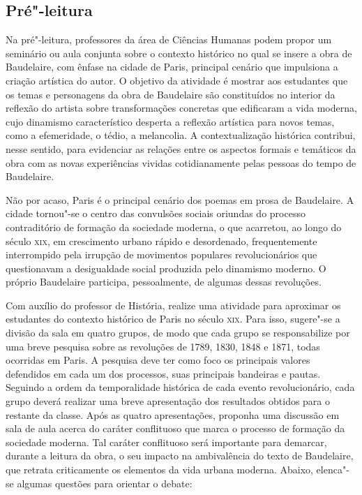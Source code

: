 \documentclass[12pt]{extarticle}
\begin{document}
\subsection{Pré"-leitura}

Na pré"-leitura, professores da área de Ciências Humanas
podem propor um seminário ou aula conjunta sobre o contexto histórico no qual se insere
a obra de Baudelaire, com ênfase na cidade de Paris, principal cenário que impulsiona a criação artística do autor. 
O objetivo da atividade é mostrar aos estudantes que os temas e personagens da obra de Baudelaire são constituídos no interior da reflexão do artista sobre transformações concretas que edificaram a vida moderna, cujo dinamismo característico desperta a reflexão artística para novos temas, como a efemeridade, o tédio, a melancolia. A contextualização histórica contribui, nesse sentido, para evidenciar as relações entre os aspectos formais e temáticos da obra com as novas experiências vividas cotidianamente pelas pessoas do tempo de Baudelaire.

Não por acaso, Paris é o principal cenário dos poemas em prosa de Baudelaire. A cidade tornou"-se o centro das convulsões sociais oriundas do processo contraditório de formação da sociedade moderna, o que acarretou, ao longo do século \textsc{xix}, em crescimento urbano rápido e desordenado, frequentemente interrompido pela irrupção de movimentos populares revolucionários que questionavam a desigualdade social produzida pelo dinamismo moderno. O próprio Baudelaire participa, pessoalmente, de algumas dessas revoluções.


Com auxílio do professor de História, realize uma atividade para aproximar os estudantes do contexto histórico de Paris no século \textsc{xix}. Para isso, sugere"-se a divisão da sala em quatro grupos, de modo que cada grupo se responsabilize por uma breve pesquisa sobre as revoluções de 1789, 1830, 1848 e 1871, todas ocorridas em Paris. A pesquisa deve ter como foco os principais valores defendidos em cada um dos processos, suas principais bandeiras e pautas. Seguindo a ordem da temporalidade histórica de cada evento revolucionário, cada grupo deverá realizar uma breve apresentação dos resultados obtidos para o restante da classe. Após as quatro apresentações, proponha uma discussão em sala de aula acerca do caráter conflituoso que marca o processo de formação da sociedade moderna. Tal caráter conflituoso será importante para demarcar, durante a leitura da obra, o seu impacto na ambivalência do texto de Baudelaire, que retrata criticamente os elementos da vida urbana moderna. Abaixo, elenca"-se algumas questões para orientar o debate:
\end{document}
